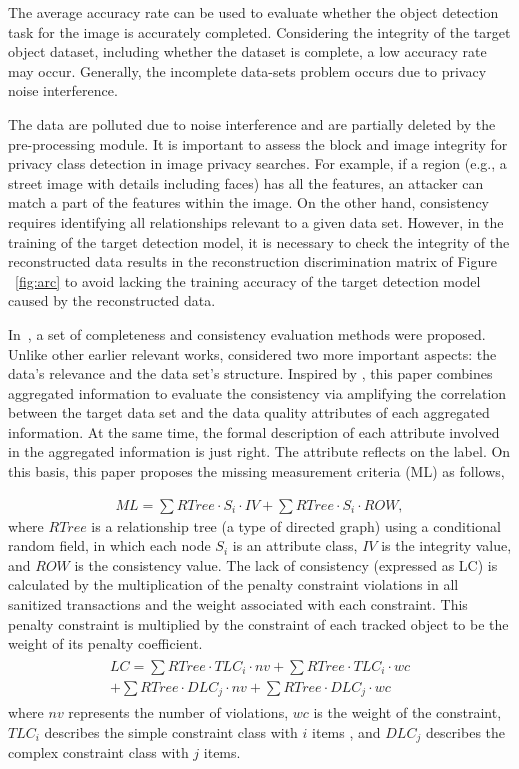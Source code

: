 \documentclass[trans]{IEEEtran}
\newcommand{\el}[1]{{\color{black}#1}}
\begin{document}
{The average accuracy rate can be used to evaluate whether the object detection task for the image is accurately completed. Considering the integrity of the target object dataset, including whether the dataset is complete, a low accuracy rate may occur.} Generally, the incomplete data-sets problem occurs due to privacy noise interference. \el{ The data are polluted due to noise interference and are partially deleted by the pre-processing module. It is important  to assess the block and image integrity  for privacy class detection in image privacy searches. For example, if a region (e.g., a street image with details including faces) has all the features, an attacker can match a part of the features within the image. On the other hand, consistency requires identifying all relationships relevant to a given data set. However, in the training of the target detection model, it is necessary to check the integrity of the reconstructed data results in the reconstruction discrimination matrix of Figure ~\ref{fig:arc} to avoid lacking the training accuracy of the target detection model caused by the reconstructed data. 

In~\cite{bertino2005information}, a set of completeness and consistency evaluation methods were proposed. Unlike other earlier relevant works, \cite{bertino2005information} considered two more important aspects: the data's relevance and the data set's structure. Inspired by \cite{bertino2005information}, this paper combines aggregated information to evaluate the consistency via amplifying the correlation between the target data set and the data quality attributes of each aggregated information. At the same time, the formal description of each attribute involved in the aggregated information is just right. The attribute reflects on the label. On this basis, this paper proposes the missing measurement criteria (ML) as follows,}
\begin{eqnarray}\label{equ:CMLdet}
ML = \sum{RTree \cdot S_i\cdot IV} + \sum {RTree\cdot S_i\cdot ROW},
\end{eqnarray}
where $RTree$ is a relationship tree (a type of directed graph) using a conditional random field, in which each node $ {S_i} $ is an attribute class, $IV$ is the integrity value, and $ROW$ is the consistency value. \el{ The lack of consistency (expressed as LC) is calculated by the multiplication of the penalty constraint violations in all sanitized transactions and the weight associated with each constraint.} This penalty constraint is multiplied by the constraint of each tracked object to be the weight of its penalty coefficient.
\begin{eqnarray}\label{equ:CSLdet}
\begin{aligned}
LC = \sum{RTree\cdot TLC_i \cdot nv} + \sum{RTree \cdot TLC_i \cdot wc} \\
+ \sum{RTree \cdot DLC_j \cdot nv} + \sum{RTree \cdot DLC_j \cdot wc}
\end{aligned}
\end{eqnarray}
where $nv$ represents the number of violations, $wc$ is the weight of the constraint, $ TLC_i $ describes the simple constraint class with $i$ items , and $ DLC_j $ describes the complex constraint class with $j$ items.
\end{document}

